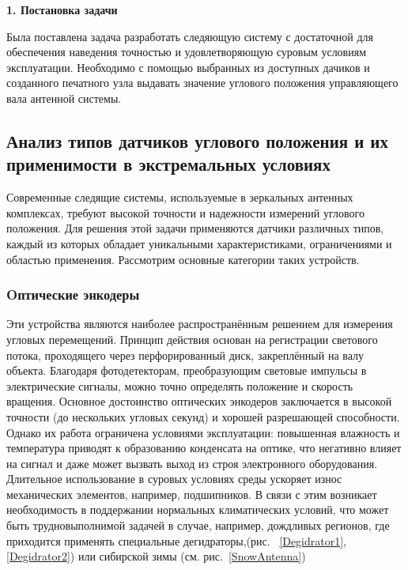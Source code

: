 \newpage
\begin{center}
  \textbf{\large 1. Постановка задачи}
\end{center}

Была поставлена задача разработать следяющую систему с достаточной для обеспечения наведения точностью и удовлетворяющую суровым условиям эксплуатации.
Необходимо с помощью выбранных из доступных дачиков и созданного печатного узла выдавать значение углового положения управляющего вала антенной системы.

\subsection{Анализ типов датчиков углового положения и их применимости в экстремальных условиях}

Современные следящие системы, используемые в зеркальных антенных комплексах, требуют высокой точности и надежности измерений углового положения. 
Для решения этой задачи применяются датчики различных типов, каждый из которых обладает уникальными характеристиками, ограничениями и областью применения. 
Рассмотрим основные категории таких устройств.

\subsubsection{Oптические энкодеры} 
  
  Эти устройства являются наиболее распространённым решением для измерения угловых перемещений. Принцип действия основан на регистрации светового потока, проходящего через перфорированный диск, 
  закреплённый на валу объекта. Благодаря фотодетекторам, преобразующим световые импульсы в электрические сигналы, можно точно определять положение и скорость вращения.
  Основное достоинство оптических энкодеров заключается в высокой точности (до нескольких угловых секунд) и хорошей разрешающей способности. 
  Однако их работа ограничена условиями эксплуатации: повышенная влажность и температура приводят к образованию конденсата на оптике, 
  что негативно влияет на сигнал и даже может вызвать выход из строя электронного оборудования. 
  Длительное использование в суровых условиях среды ускоряет износ механических элементов, например, подшипников. В связи с этим возникает необходимость в поддержании нормальных климатических условий,
  что может быть трудновыполнимой задачей в случае, например, дождливых регионов, где приходится применять специальные дегидраторы,(рис. ~\ref{Degidrator1}, \ref{Degidrator2}) 
  или сибирской зимы (см. рис.~\ref{SnowAntenna})


